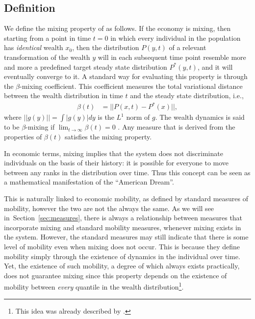 \documentclass[11pt]{article}
\newcommand{\Sref}[1]{Section~\ref{sec:#1}}
\numberwithin{equation}{section}
\begin{document}
\subsection{Definition}
We define the mixing property of as follows. If the economy is mixing, then starting from a point in time $t = 0$ in which every individual in the population has \textit{identical} wealth $x_0$, then the distribution $P(y,t)$ of a relevant transformation of the wealth $y$ will in each subsequent time point resemble more and more a predefined target steady state distribution $P^*(y,t)$, and it will eventually converge to it. A standard way for evaluating this property is through the $\beta$-mixing coefficient. This coefficient measures the total variational distance between the wealth distribution in time $t$ and the steady state distribution, i.e.,
\begin{align*}
    \beta(t) &= || P(x,t) - P^*(x) ||,
\end{align*}
where $||g(y)|| = \int |g(y)| dy$ is the $L^1$ norm of $g$. The wealth dynamics is said to be $\beta$-mixing if $\lim_{t \to\infty} \beta(t) = 0$ \cite{drees2000weighted}. Any measure that is derived from the properties of $\beta(t)$ satisfies the mixing property.

In economic terms, mixing implies that the system does not discriminate individuals on the basis of their history: it is possible for everyone to move between any ranks in the distribution over time. Thus this concept can be seen as a mathematical manifestation of the ``American Dream''. 

This is naturally linked to economic mobility, as defined by standard measures of mobility, however the two are not the always the same. As we will see in~\Sref{measures}, there is always a relationship between measures that incorporate mixing and standard mobility measures, whenever mixing exists in the system. However, the standard measures may still indicate that there is some level of mobility even when mixing does not occur. This is because they define mobility simply through the existence of dynamics in the individual over time. Yet, the existence of such mobility, a degree of which always exists practically, does not guarantee mixing since this property depends on the existence of mobility between \textit{every} quantile in the wealth distribution\footnote{This idea was already described by \citet{Mcfarland1970}.}.
 
\end{document}
